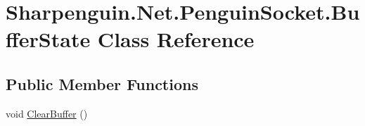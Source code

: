 \hypertarget{classSharpenguin_1_1Net_1_1PenguinSocket_1_1BufferState}{\section{Sharpenguin.\-Net.\-Penguin\-Socket.\-Buffer\-State Class Reference}
\label{classSharpenguin_1_1Net_1_1PenguinSocket_1_1BufferState}
}
\subsection*{Public Member Functions}
\begin{DoxyCompactItemize}
\item 
void \hyperlink{classSharpenguin_1_1Net_1_1PenguinSocket_1_1BufferState_a7f60791eefcb5676737befc3cf148cf9}{Clear\-Buffer} ()
\end{DoxyCompactItemize}
